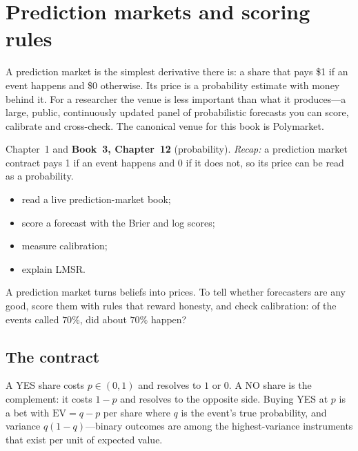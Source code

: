 \chapter{Prediction markets and scoring rules}\label{ch:pm}

\noindent A prediction market is the simplest derivative there is: a share that pays \$1 if an
event happens and \$0 otherwise. Its price is a probability estimate with money behind it. For
a researcher the venue is less important than what it produces---a large, public, continuously
updated panel of probabilistic forecasts you can score, calibrate and cross-check. The canonical
venue for this book is Polymarket.

\begin{rulebox}
Chapter~1 and \textbf{Book~3, Chapter~12} (probability). \emph{Recap:} a prediction market contract pays 1 if an event happens and 0 if it does not, so its price can be read as a probability.
\end{rulebox}
\begin{wins}
\begin{itemize}
\item read a live prediction-market book;
\item score a forecast with the Brier and log scores;
\item measure calibration;
\item explain LMSR.
\end{itemize}
\end{wins}
\begin{principle}
A prediction market turns beliefs into prices. To tell whether forecasters are any good, score them with rules that reward honesty, and check calibration: of the events called $70\%$, did about $70\%$ happen?
\end{principle}

\section{The contract}\label{sec:pmcontract}

A YES share costs $p\in(0,1)$ and resolves to $1$ or $0$. A NO share is the complement: it costs
$1-p$ and resolves to the opposite side. Buying YES at $p$ is a bet with
$\mathrm{EV}=q-p$ per share where $q$ is the event's true probability, and variance
$q(1-q)$---binary outcomes are among the highest-variance instruments that exist per unit of
expected value.

